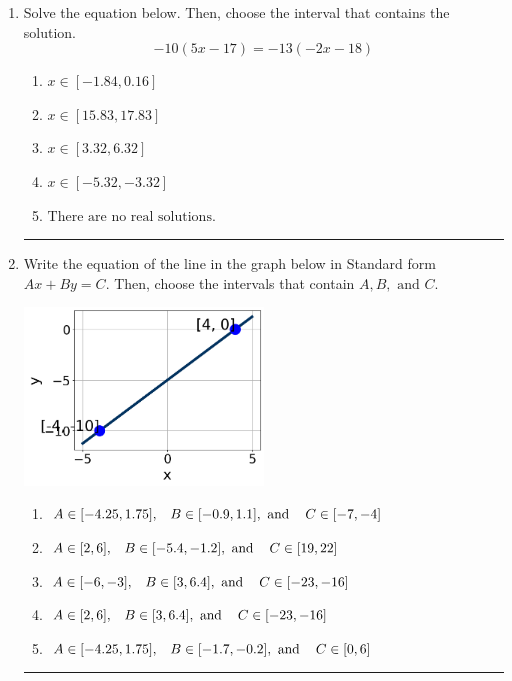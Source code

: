 \documentclass[14pt]{extbook}
\newcommand{\litem}[1]{\item#1\hspace*{-1cm}\rule{\textwidth}{0.4pt}}
\begin{document}
\begin{enumerate}
{\begin{enumerate}[label=\Alph*.]
\end{enumerate} }
\litem{
Solve the equation below. Then, choose the interval that contains the solution.\[ -10(5x -17) = -13(-2x -18) \]\begin{enumerate}[label=\Alph*.]
\item \( x \in [-1.84, 0.16] \)
\item \( x \in [15.83, 17.83] \)
\item \( x \in [3.32, 6.32] \)
\item \( x \in [-5.32, -3.32] \)
\item \( \text{There are no real solutions.} \)

\end{enumerate} }
\litem{
Write the equation of the line in the graph below in Standard form $Ax+By=C$. Then, choose the intervals that contain $A, B, \text{ and } C$.
\begin{center}
    \includegraphics[width=0.5\textwidth]{../Figures/linearGraphToStandardC.png}
\end{center}
\begin{enumerate}[label=\Alph*.]
\item \( A \in [-4.25, 1.75], \hspace{3mm} B \in [-0.9, 1.1], \text{ and } \hspace{3mm} C \in [-7, -4] \)
\item \( A \in [2, 6], \hspace{3mm} B \in [-5.4, -1.2], \text{ and } \hspace{3mm} C \in [19, 22] \)
\item \( A \in [-6, -3], \hspace{3mm} B \in [3, 6.4], \text{ and } \hspace{3mm} C \in [-23, -16] \)
\item \( A \in [2, 6], \hspace{3mm} B \in [3, 6.4], \text{ and } \hspace{3mm} C \in [-23, -16] \)
\item \( A \in [-4.25, 1.75], \hspace{3mm} B \in [-1.7, -0.2], \text{ and } \hspace{3mm} C \in [0, 6] \)

\end{enumerate} }
\end{enumerate}
\end{document}
